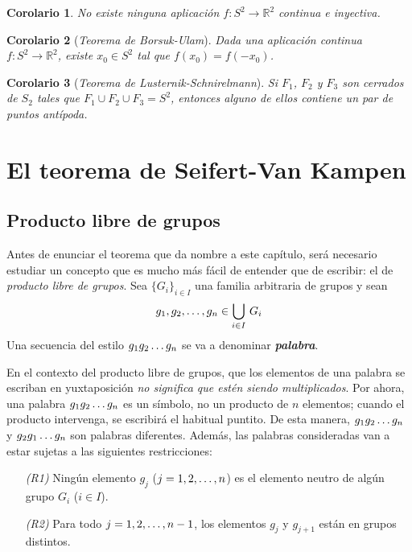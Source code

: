 \documentclass[11pt]{report}
\newtheorem{corollary}{Corolario}[chapter]
\theoremstyle{definition}
\theoremstyle{definition}
\theoremstyle{remark}
\newcommand{\R}{\mathbb R}
\begin{document}
\begin{corollary}
No existe ninguna aplicación $f \colon S^2 \to \R^2$ continua e inyectiva.
\end{corollary}

\begin{corollary}[\textit{Teorema de Borsuk-Ulam}]
Dada una aplicación continua $f \colon S^2 \to \R^2$, existe $x_0 \in S^2$ tal que $f(x_0)=f(-x_0)$.
\end{corollary}

\begin{corollary}[\textit{Teorema de Lusternik-Schnirelmann}]
Si $F_1$, $F_2$ y $F_3$ son cerrados de $S_2$ tales que $F_1 \cup F_2 \cup F_3 = S^2$, entonces alguno de ellos contiene un par de puntos antípoda.
\end{corollary}

\chapter{El teorema de Seifert-Van Kampen}

\section{Producto libre de grupos}

Antes de enunciar el teorema que da nombre a este capítulo, será necesario estudiar un concepto que es mucho más fácil de entender que de escribir: el de \textit{producto libre de grupos}. Sea $\{G_i\}_{i \in I}$ una familia arbitraria de grupos y sean
\[g_1,g_2,\mathellipsis,g_n \in \bigcup_{i \in I} \, G_i\]
Una secuencia del estilo $g_1g_2\mathellipsis g_n$ se va a denominar \textbf{\textit{palabra}}. 

\vspace{2mm}

En el contexto del producto libre de grupos, que los elementos de una palabra se escriban en yuxtaposición \textit{no significa que estén siendo multiplicados}. Por ahora, una palabra $g_1g_2\mathellipsis g_n$ es un símbolo, no un producto de $n$ elementos; cuando el producto intervenga, se escribirá el habitual puntito. De esta manera, $g_1g_2\mathellipsis g_n$ y $g_2g_1\mathellipsis g_n$ son palabras diferentes. Además, las palabras consideradas van a estar sujetas a las siguientes restricciones:

\begin{itemize}
    \item[\textit{(R1)}] Ningún elemento $g_j$ ($j=1,2,\mathellipsis,n$) es el elemento neutro de algún grupo $G_i$ ($i \in I$).
    \item[\textit{(R2)}] Para todo $j =1,2,\mathellipsis,n-1$, los elementos $g_j$ y $g_{j+1}$ están en grupos distintos.
\end{itemize}
\end{document}
